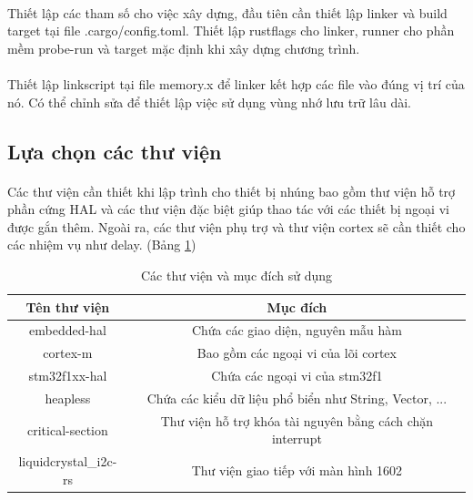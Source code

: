 \paragraph{}
Thiết lập các tham số cho việc xây dựng, đầu tiên cần thiết lập linker và build target tại file .cargo/config.toml. Thiết lập rustflags cho linker, runner cho phần mềm probe-run và target mặc định khi xây dựng chương trình.

\paragraph{}
Thiết lập linkscript tại file memory.x để linker kết hợp các file vào đúng vị trí của nó. Có thể chỉnh sửa để thiết lập việc sử dụng vùng nhớ lưu trữ lâu dài.


\subsection{Lựa chọn các thư viện}
\paragraph{}
Các thư viện cần thiết khi lập trình cho thiết bị nhúng bao gồm thư viện hỗ trợ phần cứng HAL và các thư viện đặc biệt giúp thao tác với các thiết bị ngoại vi được gắn thêm. Ngoài ra, các thư viện phụ trợ và thư viện cortex sẽ cần thiết cho các nhiệm vụ như delay. (Bảng \ref{tab:all-lib})
\begin{table}[H]
	\centering
	\caption{Các thư viện và mục đích sử dụng}
	\begin{tabular}{|c|c|}
		\hline
		\bfseries Tên thư viện & \bfseries Mục đích \\
		\hline
		embedded-hal & Chứa các giao diện, nguyên mẫu hàm \\
		\hline
		cortex-m & Bao gồm các ngoại vi của lõi cortex \\
		\hline
		stm32f1xx-hal & Chứa các  ngoại vi của stm32f1 \\
		\hline
		heapless & Chứa các kiểu dữ liệu phổ biển như String, Vector, ...  \\
		\hline
		critical-section & Thư viện hỗ trợ khóa tài nguyên bằng cách chặn interrupt  \\
		\hline
		liquidcrystal\_i2c-rs & Thư viện giao tiếp với màn hình 1602  \\
		\hline
	\end{tabular}
	\label{tab:all-lib}
\end{table}	

